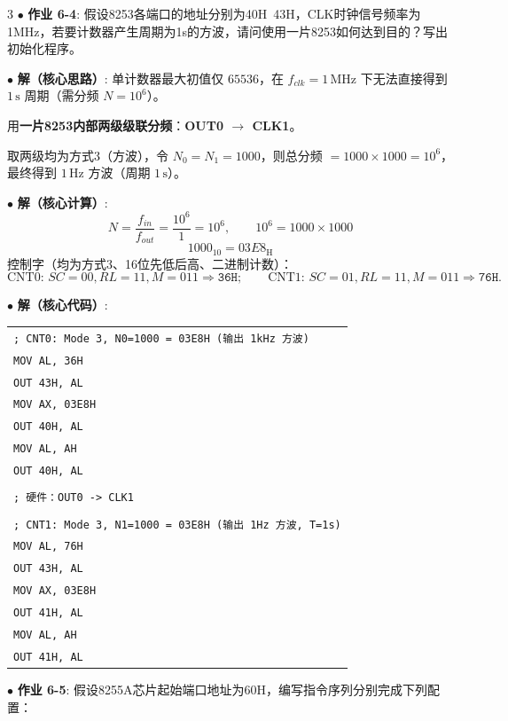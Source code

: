 \documentclass[10pt, a4paper, landscape]{article}
\newcommand{\red}[1]{\textbf{\textcolor{myred}{#1}}}
\newcommand{\green}[1]{\textbf{\textcolor{mygreen}{#1}}}
\newcommand{\entry}[2]{$\bullet$ \textbf{#1}: #2\par\vspace{0.5pt}}
\begin{document}
\begin{multicols*}{3}
\entry{\green{作业 6-4}}{假设8253各端口的地址分别为40H~43H，CLK时钟信号频率为1MHz，若要计数器产生周期为1s的方波，请问使用一片8253如何达到目的？写出初始化程序。}

\entry{解（核心思路）}{
    单计数器最大初值仅 $65536$，在 $f_{clk}=1\,\text{MHz}$ 下无法直接得到 $1\,\text{s}$ 周期（需分频 $N=10^6$）。\par
    用\red{一片8253内部两级级联分频}：\textbf{OUT0 $\rightarrow$ CLK1}。\par
    取两级均为方式3（方波），令 $N_0=N_1=1000$，则总分频 $=1000\times1000=10^6$，最终得到 $1\,\text{Hz}$ 方波（周期 $1\,\text{s}$）。
}

\entry{解（核心计算）}{
\[
N=\frac{f_{in}}{f_{out}}=\frac{10^6}{1}=10^6,\qquad
10^6=1000\times1000
\]
\[
1000_{10}=03E8_{\mathrm{H}}
\]
控制字（均为方式3、16位先低后高、二进制计数）：
\[
\text{CNT0: }SC=00,RL=11,M=011 \Rightarrow \texttt{36H};\qquad
\text{CNT1: }SC=01,RL=11,M=011 \Rightarrow \texttt{76H}.
\]
}

\entry{解（核心代码）}{
\begin{tabular}{@{}l@{}}
\texttt{; CNT0: Mode 3, N0=1000 = 03E8H (输出 1kHz 方波)} \\
\texttt{MOV  AL, 36H} \\
\texttt{OUT  43H, AL} \\
\texttt{MOV  AX, 03E8H} \\
\texttt{OUT  40H, AL} \\
\texttt{MOV  AL, AH} \\
\texttt{OUT  40H, AL} \\
\\
\texttt{; 硬件：OUT0 -> CLK1} \\
\\
\texttt{; CNT1: Mode 3, N1=1000 = 03E8H (输出 1Hz 方波, T=1s)} \\
\texttt{MOV  AL, 76H} \\
\texttt{OUT  43H, AL} \\
\texttt{MOV  AX, 03E8H} \\
\texttt{OUT  41H, AL} \\
\texttt{MOV  AL, AH} \\
\texttt{OUT  41H, AL} \\
\end{tabular}
}

\entry{\green{作业 6-5}}{假设8255A芯片起始端口地址为60H，编写指令序列分别完成下列配置：}


\end{multicols*}
\end{document}
